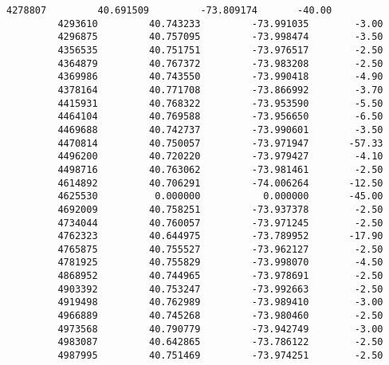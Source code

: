 \documentclass[11pt]{article}
\begin{document}
\begin{Verbatim}[commandchars=\\\{\}]
         4278807         40.691509         -73.809174       -40.00   
         4293610         40.743233         -73.991035        -3.00   
         4296875         40.757095         -73.998474        -3.50   
         4356535         40.751751         -73.976517        -2.50   
         4364879         40.767372         -73.983208        -2.50   
         4369986         40.743550         -73.990418        -4.90   
         4378164         40.771708         -73.866992        -3.70   
         4415931         40.768322         -73.953590        -5.50   
         4464104         40.769588         -73.956650        -6.50   
         4469688         40.742737         -73.990601        -3.50   
         4470814         40.750057         -73.971947       -57.33   
         4496200         40.720220         -73.979427        -4.10   
         4498716         40.763062         -73.981461        -2.50   
         4614892         40.706291         -74.006264       -12.50   
         4625530          0.000000           0.000000       -45.00   
         4692009         40.758251         -73.937378        -2.50   
         4734044         40.760057         -73.971245        -2.50   
         4762323         40.644975         -73.789952       -17.90   
         4765875         40.755527         -73.962127        -2.50   
         4781925         40.755829         -73.998070        -4.50   
         4868952         40.744965         -73.978691        -2.50   
         4903392         40.753247         -73.992663        -2.50   
         4919498         40.762989         -73.989410        -3.00   
         4966889         40.745268         -73.980460        -2.50   
         4973568         40.790779         -73.942749        -3.00   
         4983087         40.642865         -73.786122        -2.50   
         4987995         40.751469         -73.974251        -2.50   
         

\end{Verbatim}
\end{document}
